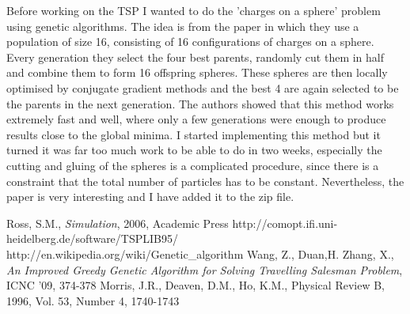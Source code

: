 \documentclass[10pt,a4paper]{article}
\begin{document}
Before working on the TSP I wanted to do the 'charges on a sphere' problem using genetic algorithms. The idea is from the paper \cite{gen1} in which they use a population of size 16, consisting of 16 configurations of charges on a sphere. Every generation they select the four best parents, randomly cut them in half and combine them to form 16 offspring spheres. These spheres are then locally optimised by conjugate gradient methods and the best 4 are again selected to be the parents in the next generation. The authors showed that this method works extremely fast and well, where only a few generations were enough to produce results close to the global minima. I started implementing this method but it turned it was far too much work to be able to do in two weeks, especially the cutting and gluing of the spheres is a complicated procedure, since there is a constraint that the total number of particles has to be constant. Nevertheless, the paper is very interesting and I have added it to the zip file.

\begin{thebibliography}{15}
  Ross, S.M., \emph{Simulation}, 2006, Academic Press
  http://comopt.ifi.uni-heidelberg.de/software/TSPLIB95/
  http://en.wikipedia.org/wiki/Genetic\_algorithm
  Wang, Z., Duan,H. Zhang, X., \emph{An Improved Greedy Genetic Algorithm for Solving Travelling Salesman Problem}, ICNC '09, 374-378
Morris, J.R., Deaven, D.M., Ho, K.M., Physical Review B, 1996, Vol. 53, Number 4, 1740-1743 
\end{thebibliography}
\end{document}
